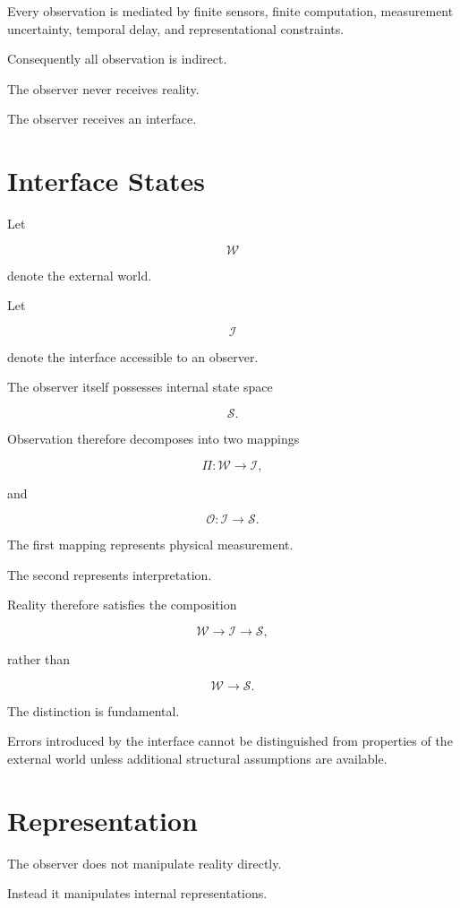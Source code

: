 \documentclass[11pt,oneside]{book}
\numberwithin{equation}{chapter}
\theoremstyle{definition}
\theoremstyle{plain}
\begin{document}
Every observation is mediated by finite sensors, finite computation,
measurement uncertainty, temporal delay, and representational constraints.

Consequently all observation is indirect.

The observer never receives reality.

The observer receives an interface.

\section{Interface States}

Let

\[
\mathcal{W}
\]

denote the external world.

Let

\[
\mathcal{I}
\]

denote the interface accessible to an observer.

The observer itself possesses internal state space

\[
\mathcal{S}.
\]

Observation therefore decomposes into two mappings

\[
\Pi:
\mathcal{W}
\rightarrow
\mathcal{I},
\]

and

\[
\mathcal{O}:
\mathcal{I}
\rightarrow
\mathcal{S}.
\]

The first mapping represents physical measurement.

The second represents interpretation.

Reality therefore satisfies the composition

\[
\mathcal{W}
\longrightarrow
\mathcal{I}
\longrightarrow
\mathcal{S},
\]

rather than

\[
\mathcal{W}
\longrightarrow
\mathcal{S}.
\]

The distinction is fundamental.

Errors introduced by the interface cannot be distinguished from properties of
the external world unless additional structural assumptions are available.

\section{Representation}

The observer does not manipulate reality directly.

Instead it manipulates internal representations.
\end{document}
